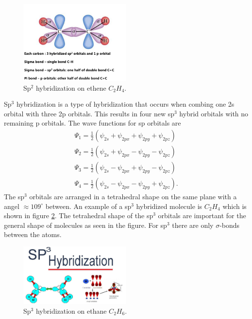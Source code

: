\documentclass[jmp, amsmath, amssymb, reprint]{article}
\numberwithin{equation}{section}
\newcommand{\lp}{\left(}
\newcommand{\rp}{\right)}
\begin{document}
\begin{multicols}{2}
\begin{figure}[H]
	\centering
  	\includegraphics[width=0.50\textwidth]{sp2_orbital.png}%
	\caption{Sp\(^2\) hybridization on ethene \(C_2H_4\).}
	\label{fig:sp2_orbital}
\end{figure}

Sp\(^3\) hybridization is a type of hybridization that occurs when combing one 2s orbital with three 2p orbitals. This results in four new sp\(^3\) hybrid orbitals with no remaining p orbitals. The wave functions for sp orbitals are
\begin{align}
\Psi_1 = \frac{1}{2}\lp \psi_{2s} + \psi_{2px} + \psi_{2py} + \psi_{2pz}\rp\\
\Psi_2 = \frac{1}{2}\lp \psi_{2s} + \psi_{2px} - \psi_{2py} - \psi_{2pz}\rp\\
\Psi_3 = \frac{1}{2}\lp \psi_{2s} - \psi_{2px} + \psi_{2py} - \psi_{2pz}\rp\\
\Psi_4 = \frac{1}{2}\lp \psi_{2s} - \psi_{2px} - \psi_{2py} + \psi_{2pz}\rp.
\end{align}
The sp\(^3\) orbitals are arranged in a tetrahedral shape on the same plane with a angel \(\approx 109^\circ\) between. An example of a sp\(^3\) hybridized molecule is \(C_2H_4\) which is shown in figure \ref{fig:sp3_orbital}. The tetrahedral shape of the sp\(^3\) orbitals are important for the general shape of molecules as seen in the figure. For sp\(^3\) there are only \(\sigma\)-bonds between the atoms.

\begin{figure}[H]
	\centering
  	\includegraphics[width=0.50\textwidth]{sp3_orbital.png}%
	\caption{Sp\(^3\) hybridization on ethane \(C_2H_6\).}
	\label{fig:sp3_orbital}
\end{figure}


\end{multicols}
\end{document}
